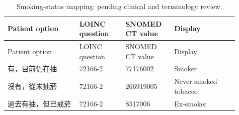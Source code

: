 {\small\setlength{\tabcolsep}{3pt}
\begin{longtable}{p{0.29\linewidth}p{0.18\linewidth}p{0.19\linewidth}p{0.25\linewidth}}
\caption{Smoking-status mapping: pending clinical and terminology review.}\label{sup:smoking}\\
\hline
Patient option & LOINC question & SNOMED CT value & Display \\ \hline
\endfirsthead
\hline
Patient option & LOINC question & SNOMED CT value & Display \\ \hline
\endhead
有，目前仍在抽 & 72166-\allowbreak{}2 & 77176002 & Smoker \\
沒有，從未抽菸 & 72166-\allowbreak{}2 & 266919005 & Never smoked tobacco \\
過去有抽，但已戒菸 & 72166-\allowbreak{}2 & 8517006 & Ex-\allowbreak{}smoker \\
\hline\end{longtable}}
